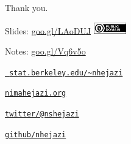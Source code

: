 \documentclass[12pt,t,handout]{beamer}
\begin{document}
\begin{frame}[c]{Thank you.}

\Large
Slides: \href{https://goo.gl/LAoDUJ}{goo.gl/LAoDUJ} \quad
\includegraphics[height=5mm]{Figs/cc-zero.png}

\vspace{3mm}
Notes: \href{https://goo.gl/Vq6v5o}{goo.gl/Vq6v5o}


\vspace{3mm}
\href{https://www.stat.berkeley.edu/~nhejazi}{\tt
  stat.berkeley.edu/\textasciitilde{}nhejazi}

\vspace{3mm}
\href{https://nimahejazi.org}{\tt nimahejazi.org}

\vspace{3mm}
\href{https://twitter.com/nshejazi}{\tt twitter/@nshejazi}

\vspace{3mm}
\href{https://github.com/nhejazi}{\tt github/nhejazi}


\end{frame}

\end{document}
